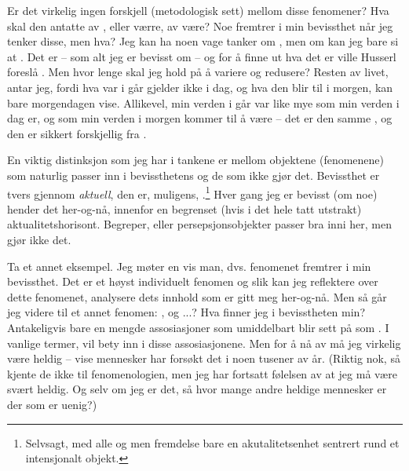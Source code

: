 Er det virkelig ingen forskjell (metodologisk sett) mellom disse 
fenomener? Hva skal den antatte  av , eller 
v{\ae}rre, av  v{\ae}re? Noe fremtrer i min 
bevissthet n{\aa}r jeg tenker disse, men hva? Jeg kan ha noen vage 
tanker om , men om  kan jeg bare si at 
. Det er  -- som alt jeg 
er bevisst om -- og for {\aa} finne ut hva det er ville Husserl 
foresl{\aa} . Men hvor lenge skal jeg hold 
p{\aa} {\aa} variere og redusere? Resten av livet, antar jeg, fordi 
hva  var i g{\aa}r gjelder ikke i dag, og hva den blir 
til i morgen, kan bare morgendagen vise. Allikevel, min verden i 
g{\aa}r var like mye  som min verden i dag er, og som 
min verden i morgen kommer til {\aa} v{\ae}re -- det er den samme 
, og den er sikkert forskjellig fra .

En viktig distinksjon som jeg har i tankene er mellom objektene 
(fenomenene) som naturlig passer inn i bevissthetens
 og de som ikke gj{\o}r det. Bevissthet er 
tvers gjennom {\em aktuell}, den er, muligens, .\footnote{Selvsagt, med alle  og 
 men fremdelse bare en akutalitetsenhet sentrert rund 
et intensjonalt objekt.} Hver gang jeg er bevisst (om noe) hender det 
her-og-n{\aa}, innenfor en begrenset (hvis i det hele tatt utstrakt) 
aktualitetshorisont. Begreper, eller persepsjonsobjekter passer bra inni 
her, men  gj{\o}r ikke det.

Ta et annet eksempel. Jeg m{\o}ter en vis man, dvs. fenomenet 
 fremtrer i min bevissthet. Det er et h{\o}yst 
individuelt fenomen og slik kan jeg reflektere over dette 
fenomenet, analysere dets innhold som er gitt meg her-og-n{\aa}. Men 
s{\aa} g{\aa}r jeg videre til et annet fenomen: , og ...? 
Hva finner jeg i bevisstheten min? Antakeligvis bare en mengde 
assosiasjoner som umiddelbart blir sett p{\aa} som . 
I vanlige termer, vil  bety  inn i disse assosiasjonene. Men for {\aa} n{\aa} 
 av  m{\aa} jeg virkelig v{\ae}re heldig -- 
vise mennesker har fors{\o}kt det i noen tusener av {\aa}r. (Riktig 
nok, s{\aa} kjente de ikke til fenomenologien, men jeg har fortsatt 
f{\o}lelsen av at jeg m{\aa} v{\ae}re sv{\ae}rt heldig. Og selv om 
jeg er det, s{\aa} hvor mange andre heldige mennesker er der som er 
uenig?)

